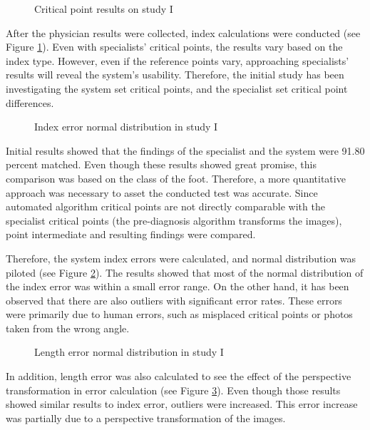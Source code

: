 \begin{figure}[htbp]
\centering
{}
\caption{Critical point results on study I}
\label{fig:StudyICriticalPointResult}
\end{figure}

After the physician results were collected, index calculations were conducted (see Figure \ref{fig:StudyICriticalPointResult}). Even with specialists' critical points, the results vary based on the index type. However, even if the reference points vary, approaching specialists' results will reveal the system's usability. Therefore, the initial study has been investigating the system set critical points, and the specialist set critical point differences.

\begin{figure}[htbp]
\centering
{}
\caption{Index error normal distribution in study I}
\label{fig:StudyIIndexErrorNormalDists}
\end{figure}

Initial results showed that the findings of the specialist and the system were 91.80 percent matched. Even though these results showed great promise, this comparison was based on the class of the foot. Therefore, a more quantitative approach was necessary to asset the conducted test was accurate. Since automated algorithm critical points are not directly comparable with the specialist critical points (the pre-diagnosis algorithm transforms the images), point intermediate and resulting findings were compared.

Therefore, the system index errors were calculated, and normal distribution was piloted (see Figure \ref{fig:StudyIIndexErrorNormalDists}). The results showed that most of the normal distribution of the index error was within a small error range. On the other hand, it has been observed that there are also outliers with significant error rates. These errors were primarily due to human errors, such as misplaced critical points or photos taken from the wrong angle. 

\begin{figure}[htbp]
\centering
{}
\caption{Length error normal distribution in study I}
\label{fig:StudyILenghtErrorNormalDists}
\end{figure}

In addition, length error was also calculated to see the effect of the perspective transformation in error calculation (see Figure \ref{fig:StudyILenghtErrorNormalDists}). Even though those results showed similar results to index error, outliers were increased. This error increase was partially due to a perspective transformation of the images.
